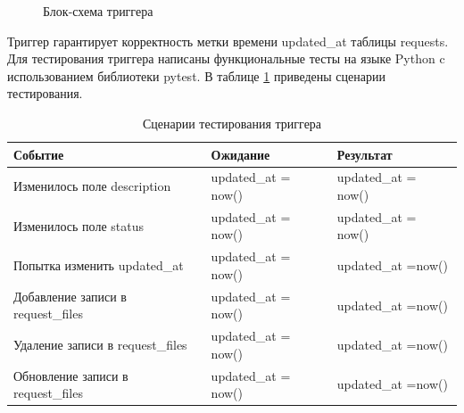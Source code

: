 \begin{figure}[h!]
	\caption{Блок-схема триггера}
	\label{fig:trigger}
\end{figure}

Триггер гарантирует корректность метки времени updated{\_}at таблицы requests. Для тестирования триггера написаны функциональные тесты на языке Python c использованием библиотеки pytest. В таблице \ref{tab:trigger_tests} приведены сценарии тестирования.

\begin{table}[ht!]
	\centering
	\caption{\label{tab:trigger_tests} Сценарии тестирования триггера}
	\begin{tabular}{|p{7.5cm}|p{4cm}|p{4cm}|}
		\hline
		\textbf{Событие} & \textbf{Ожидание} & \textbf{Результат}\\
		\hline
		Изменилось поле description & updated{\_}at = now() & updated{\_}at = now() \\
		\hline
		Изменилось поле status & updated{\_}at = now() & updated{\_}at =  now() \\
		\hline
		Попытка изменить updated{\_}at & updated{\_}at = now() & updated{\_}at =now() \\
		\hline
		Добавление записи в request{\_}files & updated{\_}at = now() & updated{\_}at =now() \\
		\hline
		Удаление записи в request{\_}files & updated{\_}at = now() & updated{\_}at =now() \\
		\hline
		Обновление записи в request{\_}files & updated{\_}at = now() & updated{\_}at =now() \\
\hline
		
	\end{tabular}
\end{table}

